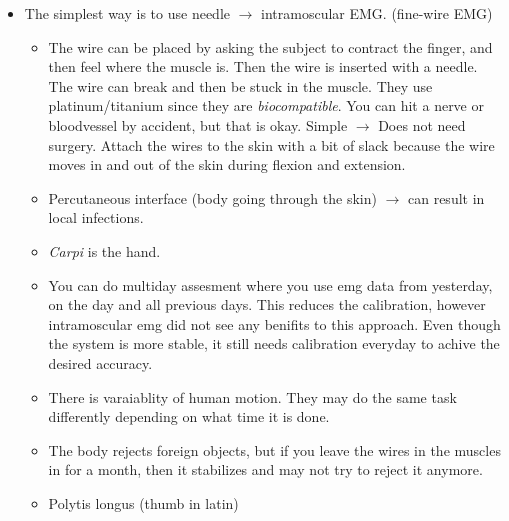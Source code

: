\documentclass[a4paper]{article}
\begin{document}
\begin{itemize}
	\item The simplest way is to use needle $ \rightarrow $ intramoscular EMG. (fine-wire EMG)
	\begin{itemize}
	\item The wire can be placed by asking the subject to contract the finger, and then feel where the muscle is. Then the wire is inserted with a needle. The wire can break and then be stuck in the muscle. They use platinum/titanium since they are \textit{biocompatible}. You can hit a nerve or bloodvessel by accident, but that is okay. Simple $ \rightarrow $ Does not need surgery. Attach the wires to the skin with a bit of slack because the wire moves in and out of the skin during flexion and extension. 

	\item Percutaneous interface (body going through the skin) $ \rightarrow $ can result in local infections.

	\item \textit{Carpi} is the hand.

	\item You can do multiday assesment where you use emg data from yesterday, on the day and all previous days. This reduces the calibration, however intramoscular emg did not see any benifits to this approach. Even though the system is more stable, it still needs calibration everyday to achive the desired accuracy. 

	\item There is varaiablity of human motion. They may do the same task differently depending on what time it is done. 

	\item The body rejects foreign objects, but if you leave the wires in the muscles in for a month, then it stabilizes and may not try to reject it anymore. 
	\item Polytis longus (thumb in latin)


\end{itemize}
\end{itemize}
\end{document}
